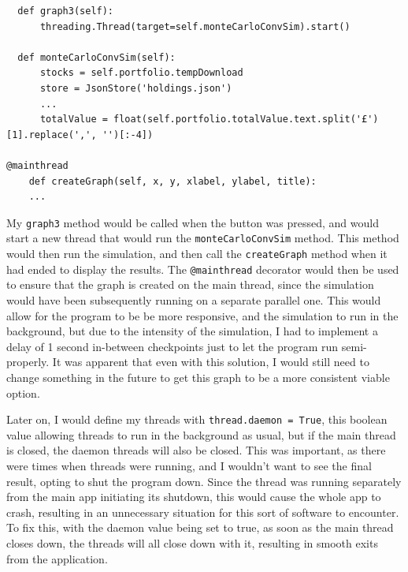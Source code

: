 \documentclass{article}
\begin{document}
\begin{verbatim}
  def graph3(self):
      threading.Thread(target=self.monteCarloConvSim).start()

  def monteCarloConvSim(self):
      stocks = self.portfolio.tempDownload
      store = JsonStore('holdings.json')
      ...
      totalValue = float(self.portfolio.totalValue.text.split('£')[1].replace(',', '')[:-4])

@mainthread
    def createGraph(self, x, y, xlabel, ylabel, title):
    ...
\end{verbatim}

\vspace{0.3cm}
My \texttt{graph3} method would be called when the button was pressed, and would start a new thread that would run the \texttt{monteCarloConvSim} method. This method would then run the simulation, and then call the \texttt{createGraph} method  when it had ended to display the results. The \texttt{@mainthread} decorator would then be used to ensure that the graph is created on the main thread, since the simulation would have been subsequently running on a separate parallel one. This would allow for the program to be be more responsive, and the simulation to run in the background, but due to the intensity of the simulation, I had to implement a delay of 1 second in-between checkpoints just to let the program run semi-properly. It was apparent that even with this solution, I would still need to change something in the future to get this graph to be a more consistent viable option.\\\vspace{0.3cm}

Later on, I would define my threads with \texttt{thread.daemon = True}, this boolean value allowing threads to run in the background as usual, but if the main thread is closed, the daemon threads will also be closed. This was important, as there were times when threads were running, and I wouldn't want to see the final result, opting to shut the program down. Since the thread was running separately from the main app initiating its shutdown, this would cause the whole app to crash, resulting in an unnecessary situation for this sort of software to encounter. To fix this, with the daemon value being set to true, as soon as the main thread closes down, the threads will all close down with it, resulting in smooth exits from the application.\\\vspace{0.3cm}
\end{document}
